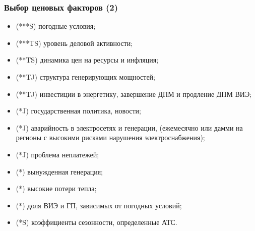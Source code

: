\documentclass[c, dvipsnames]{beamer}  %
\begin{document}
\begin{frame}[shrink=5]
\frametitle{Выбор ценовых факторов (2) } 


\begin{itemize}
	\item  (***S)   погодные условия; %
	
	\item  (***TS) уровень деловой активности;   %
	
	\item  (**TS) динамика цен на ресурсы и инфляция;
	\item  (**TJ) структура генерирующих мощностей;
	\item  (**TJ) инвестиции в энергетику, завершение ДПМ и продление ДПМ ВИЭ;
	\item  (*J) государственная политика, новости;
	\item  (*J) аварийность в электросетях и генерации, (ежемесячно или дамми на регионы с высокими рисками нарушения электроснабжения);
	\item  (*J) проблема неплатежей;
	\item  (*) вынужденная генерация;
	\item  (*) высокие потери тепла;
	\item  (*) доля ВИЭ и ГП, зависимых от погодных условий;
	\item  (*S) коэффициенты сезонности, определенные АТС. %
	
	
	
	
\end{itemize}


\end{frame}
\end{document}
